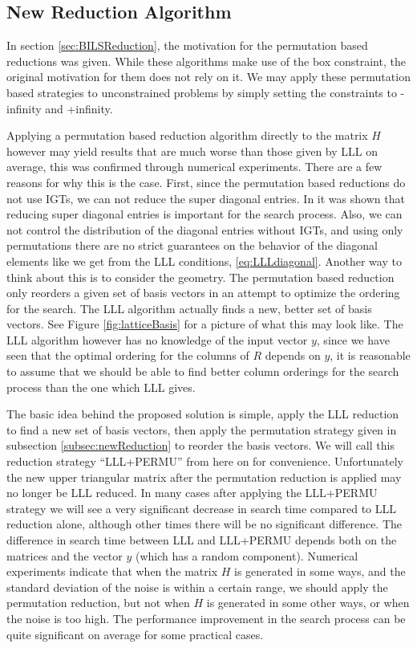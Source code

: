 \documentclass[12pt,Bold,letterpaper]{mcgilletdclass}
\newcommand{\vsp}{\vspace{\baselineskip}}
\begin{document}
\vsp \subsection{New Reduction Algorithm} \label{subsec:newOILS}
In section \ref{sec:BILSReduction}, the motivation for the permutation based reductions was given. While these algorithms make use of the box constraint, the original motivation for them does not rely on it. We may apply these permutation based strategies to unconstrained problems by simply setting the constraints to -infinity and +infinity.

Applying a permutation based reduction algorithm directly to the matrix $H$ however may yield results that are much worse than those given by LLL on average, this was confirmed through numerical experiments. There are a few reasons for why this is the case. First, since the permutation based reductions do not use IGTs, we can not reduce the super diagonal entries. In \cite{XieCB11} it was shown that reducing super diagonal entries is important for the search process. Also, we can not control the distribution of the diagonal entries without IGTs, and using only permutations there are no strict guarantees on the behavior of the diagonal elements like we get from the LLL conditions, \eqref{eq:LLLdiagonal}. Another way to think about this is to consider the geometry. The permutation based reduction only reorders a given set of basis vectors in an attempt to optimize the ordering for the search. The LLL algorithm actually finds a new, better set of basis vectors. See Figure \ref{fig:latticeBasis} for a picture of what this may look like. The LLL algorithm however has no knowledge of the input vector $y$, since we have seen that the optimal ordering for the columns of $R$ depends on $y$, it is reasonable to assume that we should be able to find better column orderings for the search process than the one which LLL gives.

The basic idea behind the proposed solution is simple, apply the LLL reduction to find a new set of basis vectors, then apply the permutation strategy given in subsection \ref{subsec:newReduction} to reorder the basis vectors. We will call this reduction strategy ``LLL+PERMU'' from here on for convenience. Unfortunately the new upper triangular matrix after the permutation reduction is applied may no longer be LLL reduced. In many cases after applying the LLL+PERMU strategy we will see a very significant decrease in search time compared to LLL reduction alone, although other times there will be no significant difference. The difference in search time between LLL and LLL+PERMU depends both on the matrices and the vector $y$ (which has a
random component). Numerical experiments indicate that when the matrix $H$ is
generated in some ways, and the standard deviation of the noise is within a
certain range, we should apply the permutation reduction, but not when $H$ is generated
in some other ways, or when the noise is too high. The performance improvement
in the search process can be quite significant on average for some practical
cases.
\end{document}
